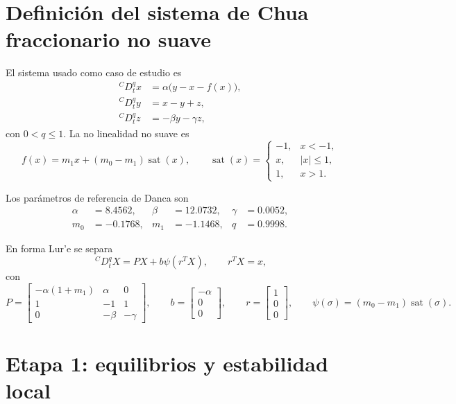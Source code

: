 \documentclass[11pt]{article}
\newcommand{\CaputoD}{\,{}^{C}D_t^q}
\begin{document}
\section{Definición del sistema de Chua fraccionario no suave}

El sistema usado como caso de estudio es
\begin{align}
{}^C D_t^q x &= \alpha\bigl(y-x-f(x)\bigr),\\
{}^C D_t^q y &= x-y+z,\\
{}^C D_t^q z &= -\beta y-\gamma z,
\end{align}
con \(0<q\le 1\). La no linealidad no suave es
\begin{equation}
 f(x)=m_1x+(m_0-m_1)\operatorname{sat}(x),
\qquad
\operatorname{sat}(x)=
\begin{cases}
-1,&x<-1,\\
x,&|x|\le 1,\\
1,&x>1.
\end{cases}
\end{equation}

Los parámetros de referencia de Danca son
\begin{equation}
\begin{aligned}
\alpha&=8.4562, & \beta&=12.0732, & \gamma&=0.0052,\\
m_0&=-0.1768, & m_1&=-1.1468, & q&=0.9998.
\end{aligned}
\end{equation}

En forma Lur'e se separa
\begin{equation}
\CaputoD X=PX+b\psi(r^TX),
\qquad
r^TX=x,
\end{equation}
con
\begin{equation}
P=\begin{bmatrix}
-\alpha(1+m_1)&\alpha&0\\
1&-1&1\\
0&-\beta&-\gamma
\end{bmatrix},
\qquad
b=\begin{bmatrix}-\alpha\\0\\0\end{bmatrix},
\qquad
r=\begin{bmatrix}1\\0\\0\end{bmatrix},
\qquad
\psi(\sigma)=(m_0-m_1)\operatorname{sat}(\sigma).
\end{equation}

\section{Etapa 1: equilibrios y estabilidad local}
\end{document}
